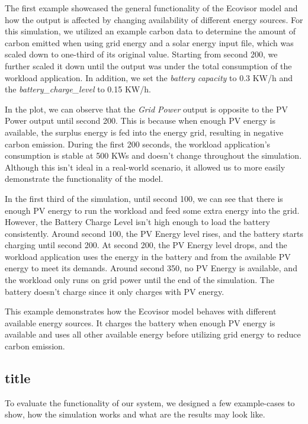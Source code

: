 The first example showcased the general functionality of the Ecovisor model and how the output is affected by changing availability of different energy sources. For this simulation, we utilized an example carbon data to determine the amount of carbon emitted when using grid energy and a solar energy input file, which was scaled down to one-third of its original value. Starting from second 200, we further scaled it down until the output was under the total consumption of the workload application. In addition, we set the \textit{battery capacity} to 0.3 KW/h and the \textit{battery\_charge\_level} to 0.15 KW/h.

In the plot, we can observe that the \textit{Grid Power} output is opposite to the PV Power output until second 200. This is because when enough PV energy is available, the surplus energy is fed into the energy grid, resulting in negative carbon emission. During the first 200 seconds, the workload application's consumption is stable at 500 KWs and doesn't change throughout the simulation. Although this isn't ideal in a real-world scenario, it allowed us to more easily demonstrate the functionality of the model.

In the first third of the simulation, until second 100, we can see that there is enough PV energy to run the workload and feed some extra energy into the grid. However, the Battery Charge Level isn't high enough to load the battery consistently. Around second 100, the PV Energy level rises, and the battery starts charging until second 200. At second 200, the PV Energy level drops, and the workload application uses the energy in the battery and from the available PV energy to meet its demands. Around second 350, no PV Energy is available, and the workload only runs on grid power until the end of the simulation. The battery doesn't charge since it only charges with PV energy.

This example demonstrates how the Ecovisor model behaves with different available energy sources. It charges the battery when enough PV energy is available and uses all other available energy before utilizing grid energy to reduce carbon emission.

\subsection{title}
To evaluate the functionality of our system, we designed a few example-cases to show, how the simulation works and what are the results may look like.

